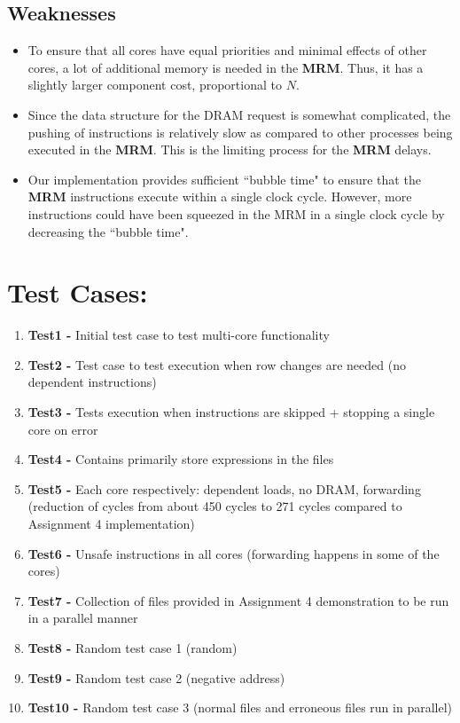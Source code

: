 \documentclass{article}
\begin{document}
\subsection{Weaknesses}
\begin{itemize}
    \item To ensure that all cores have equal priorities and minimal effects of other cores, a lot of additional memory is needed in the \textbf{MRM}. Thus, it has a slightly larger component cost, proportional to $N$.
    \item Since the data structure for the DRAM request is somewhat complicated, the pushing of instructions is relatively slow as compared to other processes being executed in the \textbf{MRM}. This is the limiting process for the \textbf{MRM} delays.
    \item Our implementation provides sufficient ``bubble time" to ensure that the \textbf{MRM} instructions execute within a single clock cycle. However, more instructions could have been squeezed in the MRM in a single clock cycle by decreasing the ``bubble time".
\end{itemize}


\section{Test Cases:}
\begin{enumerate}
    \item \textbf{Test1 -} Initial test case to test multi-core functionality
    \item \textbf{Test2 -} Test case to test execution when row changes are needed (no dependent instructions)
    \item \textbf{Test3 -} Tests execution when instructions are skipped + stopping a single core on error
    \item \textbf{Test4 -} Contains primarily store expressions in the files
    \item \textbf{Test5 -} Each core respectively: dependent loads, no DRAM, forwarding (reduction of cycles from about 450 cycles to 271 cycles compared to Assignment 4 implementation)
    \item \textbf{Test6 -} Unsafe instructions in all cores (forwarding happens in some of the cores)
    \item \textbf{Test7 -} Collection of files provided in Assignment 4 demonstration to be run in a parallel manner
    \item \textbf{Test8 -} Random test case 1 (random)
    \item \textbf{Test9 -} Random test case 2 (negative address)
    \item \textbf{Test10 -} Random test case 3 (normal files and erroneous files run in parallel)
\end{enumerate}
\end{document}
